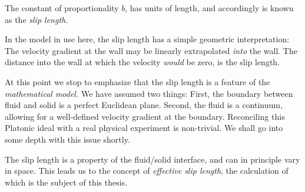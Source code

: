 \documentclass[a4paper]{report}
\begin{document}
The constant of proportionality $b$, has units of length, and accordingly is known as the \emph{slip length.}

In the model in use here, the slip length has a simple geometric interpretation: 
The velocity gradient at the wall may be linearly extrapolated \emph{into} the wall. The distance into the wall at which the velocity \emph{would} be zero, is the slip length.

\vspace{1em}

\begin{center}
\end{center}


\vspace{1em}

At this point we stop to emphasize that the slip length is a feature of the \emph{mathematical model.} We have assumed two things: First, the boundary between fluid and solid is a perfect Euclidean plane. Second, the fluid is a continuum, allowing for a well-defined velocity gradient at the boundary. Reconciling this Platonic ideal with a real physical experiment is non-trivial. We shall go into some depth with this issue shortly.

The slip length is a property of the fluid/solid interface, and can in principle vary in space. This leads us to the concept of \emph{effective slip length}, the calculation of which is the subject of this thesis.
\end{document}
